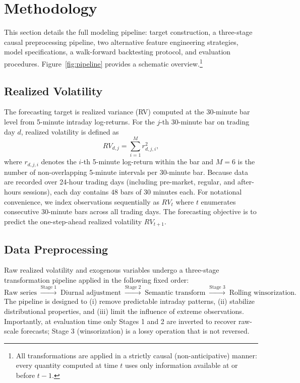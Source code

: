 \section{Methodology}
\label{sec:methodology}

This section details the full modeling pipeline: target construction, a three-stage causal preprocessing pipeline, two alternative feature engineering strategies, model specifications, a walk-forward backtesting protocol, and evaluation procedures. Figure~\ref{fig:pipeline} provides a schematic overview.\footnote{All transformations are applied in a strictly causal (non-anticipative) manner: every quantity computed at time $t$ uses only information available at or before $t-1$.}

\subsection{Realized Volatility}
\label{sec:rv_definition}

The forecasting target is realized variance (RV) computed at the 30-minute bar level from 5-minute intraday log-returns. For the $j$-th 30-minute bar on trading day $d$, realized volatility is defined as
\begin{equation}
    RV_{d,j} = \sum_{i=1}^{M} r_{d,j,i}^2,
    \label{eq:rv}
\end{equation}
where $r_{d,j,i}$ denotes the $i$-th 5-minute log-return within the bar and $M = 6$ is the number of non-overlapping 5-minute intervals per 30-minute bar. Because data are recorded over 24-hour trading days (including pre-market, regular, and after-hours sessions), each day contains $48$ bars of 30 minutes each. For notational convenience, we index observations sequentially as $RV_t$ where $t$ enumerates consecutive 30-minute bars across all trading days. The forecasting objective is to predict the one-step-ahead realized volatility $RV_{t+1}$.

\subsection{Data Preprocessing}
\label{sec:preprocessing}

Raw realized volatility and exogenous variables undergo a three-stage transformation pipeline applied in the following fixed order:
\begin{equation}
    \text{Raw series} \;\xrightarrow{\text{Stage 1}}\; \text{Diurnal adjustment} \;\xrightarrow{\text{Stage 2}}\; \text{Semantic transform} \;\xrightarrow{\text{Stage 3}}\; \text{Rolling winsorization}.
    \label{eq:pipeline}
\end{equation}
The pipeline is designed to (i) remove predictable intraday patterns, (ii) stabilize distributional properties, and (iii) limit the influence of extreme observations. Importantly, at evaluation time only Stages 1 and 2 are inverted to recover raw-scale forecasts; Stage 3 (winsorization) is a lossy operation that is not reversed.

